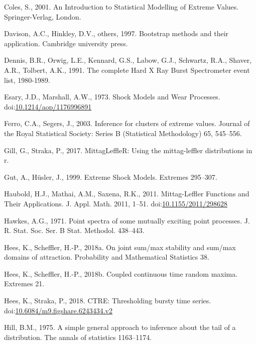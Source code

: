 \documentclass[]{elsarticle} %
\begin{document}
\leavevmode\hypertarget{ref-ColesBook}{}%
Coles, S., 2001. An Introduction to Statistical Modelling of Extreme
Values. Springer-Verlag, London.

\leavevmode\hypertarget{ref-davison1997bootstrap}{}%
Davison, A.C., Hinkley, D.V., others, 1997. Bootstrap methods and their
application. Cambridge university press.

\leavevmode\hypertarget{ref-HXRBS}{}%
Dennis, B.R., Orwig, L.E., Kennard, G.S., Labow, G.J., Schwartz, R.A.,
Shaver, A.R., Tolbert, A.K., 1991. The complete Hard X Ray Burst
Spectrometer event list, 1980-1989.

\leavevmode\hypertarget{ref-Esary1973}{}%
Esary, J.D., Marshall, A.W., 1973. Shock Models and Wear Processes.
doi:\href{https://doi.org/10.1214/aop/1176996891}{10.1214/aop/1176996891}

\leavevmode\hypertarget{ref-ferro2003inference}{}%
Ferro, C.A., Segers, J., 2003. Inference for clusters of extreme values.
Journal of the Royal Statistical Society: Series B (Statistical
Methodology) 65, 545--556.

\leavevmode\hypertarget{ref-MittagLeffleR}{}%
Gill, G., Straka, P., 2017. MittagLeffleR: Using the mittag-leffler
distributions in r.

\leavevmode\hypertarget{ref-Gut1999}{}%
Gut, A., Hüsler, J., 1999. Extreme Shock Models. Extremes 295--307.

\leavevmode\hypertarget{ref-Haubold11}{}%
Haubold, H.J., Mathai, A.M., Saxena, R.K., 2011. Mittag-Leffler
Functions and Their Applications. J. Appl. Math. 2011, 1--51.
doi:\href{https://doi.org/10.1155/2011/298628}{10.1155/2011/298628}

\leavevmode\hypertarget{ref-hawkes1971point}{}%
Hawkes, A.G., 1971. Point spectra of some mutually exciting point
processes. J. R. Stat. Soc. Ser. B Stat. Methodol. 438--443.

\leavevmode\hypertarget{ref-hees2016joint}{}%
Hees, K., Scheffler, H.-P., 2018a. On joint sum/max stability and
sum/max domains of attraction. Probability and Mathematical Statistics
38.

\leavevmode\hypertarget{ref-hees2017coupled}{}%
Hees, K., Scheffler, H.-P., 2018b. Coupled continuous time random
maxima. Extremes 21.

\leavevmode\hypertarget{ref-CTRE}{}%
Hees, K., Straka, P., 2018. CTRE: Thresholding bursty time series.
doi:\href{https://doi.org/10.6084/m9.figshare.6243434.v2}{10.6084/m9.figshare.6243434.v2}

\leavevmode\hypertarget{ref-hill1975simple}{}%
Hill, B.M., 1975. A simple general approach to inference about the tail
of a distribution. The annals of statistics 1163--1174.
\end{document}
